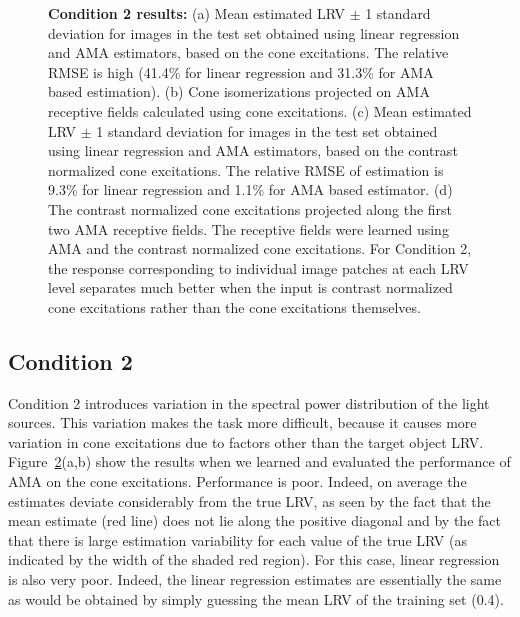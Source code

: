 \documentclass{jov}
\begin{document}
\begin{figure}
\begin{subfigure}[b]{0.22 \textwidth}
        \label{fig:case2RFResponseContrast}
    \end{subfigure}
    \caption{{\bf Condition 2 results:} (a) Mean estimated LRV $\pm$ 1 standard deviation for images in the test set obtained using linear regression and AMA estimators, based on the cone excitations. The relative RMSE is high (41.4\% for linear regression and 31.3\% for AMA based estimation). (b) Cone isomerizations projected on AMA receptive fields calculated using cone excitations. (c) Mean estimated LRV $\pm$ 1 standard deviation for images in the test set obtained using linear regression and AMA estimators, based on the contrast normalized cone excitations. The relative RMSE of estimation is 9.3\% for linear regression and 1.1\% for AMA based estimator. (d) The contrast normalized cone excitations projected along the first two AMA receptive fields. The receptive fields were learned using AMA and the contrast normalized cone excitations. For Condition 2, the response corresponding to individual image patches at each LRV level separates much better when the input is contrast normalized cone excitations rather than the cone excitations themselves.}
\label{fig:Condition2}
\end{figure}

\subsection{Condition 2}

Condition 2 introduces variation in the spectral power distribution of the light sources.
This variation makes the task more difficult, because it causes more variation in cone excitations due to factors other than the target object LRV.
Figure~\ref{fig:Condition2}(a,b) show the results when we learned and evaluated the performance of AMA on the cone excitations.
Performance is poor.
Indeed, on average the estimates deviate considerably from the true LRV, as seen by the fact that the mean estimate
(red line) does not lie along the positive diagonal and by the fact that there is large estimation variability for each
value of the true LRV (as indicated by the width of the shaded red region).
For this case, linear regression is also very poor. Indeed, the linear regression estimates are essentially the same as would be obtained
by simply guessing the mean LRV of the training set (0.4).
\end{document}
